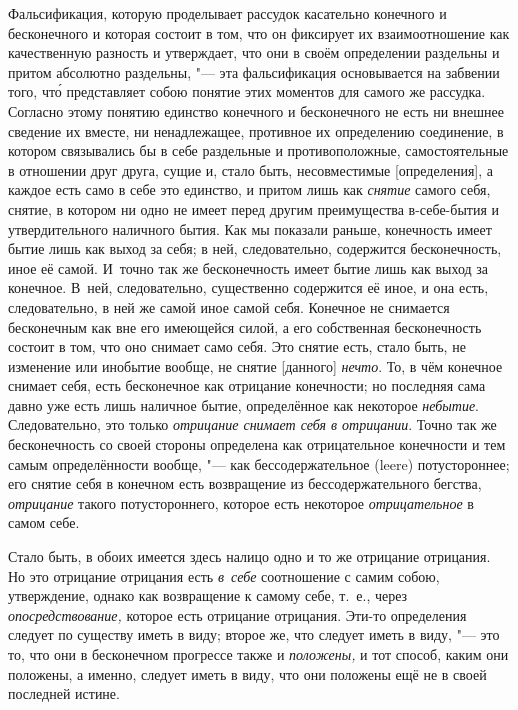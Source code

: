 Фальсификация, которую проделывает рассудок касательно конечного и
бесконечного и которая состоит в том, что он фиксирует их взаимоотношение
как качественную разность и утверждает, что они в своём определении
раздельны и притом абсолютно раздельны, "--- эта фальсификация основывается на
забвении того, чт\'{о} представляет собою понятие этих моментов для самого же
рассудка. Согласно этому понятию единство конечного и бесконечного не есть
ни внешнее сведение их вместе, ни ненадлежащее, противное их определению
соединение, в котором связывались бы в себе раздельные и противоположные,
самостоятельные в отношении друг друга, сущие и, стало быть, несовместимые
[определения], а каждое есть само в себе это единство, и притом лишь как
{\em снятие} самого себя, снятие, в котором ни одно не
имеет перед другим преимущества в-себе-бытия и утвердительного наличного
бытия. Как мы показали раньше, конечность имеет бытие лишь как выход за
себя; в ней, следовательно, содержится бесконечность, иное её самой.
И~точно так же бесконечность имеет бытие лишь как выход за конечное. В~ней,
следовательно, существенно содержится её иное, и она есть, следовательно,
в ней же самой иное самой себя. Конечное не снимается бесконечным как вне
его имеющейся силой, а его собственная бесконечность состоит в том, что оно
снимает само себя. Это снятие есть, стало быть, не изменение или инобытие
вообще, не снятие [данного] {\em нечто}. То, в чём
конечное снимает себя, есть бесконечное как отрицание конечности; но
последняя сама давно уже есть лишь наличное бытие, определённое как
некоторое {\em небытие}. Следовательно, это только
{\em отрицание снимает себя в отрицании}. Точно так же
бесконечность со своей стороны определена как отрицательное конечности и
тем самым определённости вообще, "--- как бессодержательное (leere)
потустороннее; его снятие себя в конечном есть возвращение из
бессодержательного бегства, {\em отрицание} такого
потустороннего, которое есть некоторое
{\em отрицательное} в самом себе.

Стало быть, в обоих имеется здесь налицо одно и то же отрицание отрицания.
Но это отрицание отрицания есть {\em в~себе}
соотношение с самим собою, утверждение, однако как возвращение к самому
себе, т.~е., через {\em опосредствование,} которое есть
отрицание отрицания. Эти-то определения следует по существу иметь в виду;
второе же, что следует иметь в виду, "--- это то, что они в бесконечном
прогрессе также и {\em положены,} и тот способ, каким
они положены, а именно, следует иметь в виду, что они положены ещё не в
своей последней истине.

